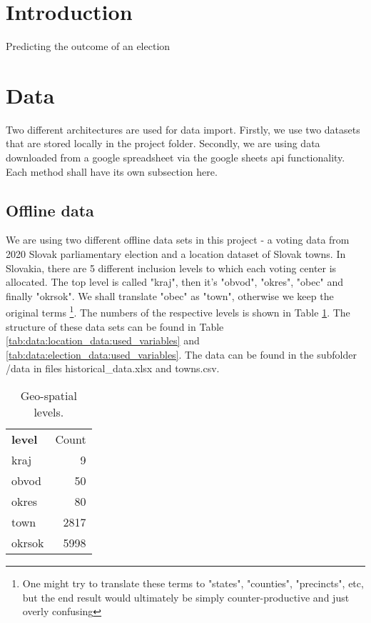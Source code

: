 \documentclass[12pt]{article}
\begin{document}
\section{Introduction}

Predicting the outcome of an election 

\section{Data}

Two different architectures are used for data import. Firstly, we use two datasets that are stored locally in the project folder. Secondly, we are using data downloaded from a google spreadsheet via the google sheets api functionality. Each method shall have its own subsection here.


\subsection{Offline data}

We are using two different offline data sets in this project - a voting data from 2020 Slovak parliamentary election and a location dataset of Slovak towns. In Slovakia, there are 5 different inclusion levels to which each voting center is allocated. The top level is called "kraj", then it's "obvod", "okres", "obec" and finally "okrsok". We shall translate "obec" as "town", otherwise we keep the original terms \footnote{One might try to translate these terms to "states", "counties", "precincts", etc, but the end result would ultimately be simply counter-productive and just overly confusing}. The numbers of the respective levels is shown in Table \ref{tab:data:Geo-spatial levels}. The structure of these data sets can be found in Table \ref{tab:data:location_data:used_variables} and \ref{tab:data:election_data:used_variables}. The data can be found in the subfolder /data in files historical\_data.xlsx and towns.csv.

\begin{table}[h]
	\centering
	\begin{tabularx}{.27\linewidth}{lr}
		\toprule
		\textbf{level} & Count \\
		kraj & 9 \\
		obvod & 50 \\
		okres & 80 \\
		town & 2817 \\
		okrsok & 5998 \\
		\bottomrule
	\end{tabularx}
	\caption{Geo-spatial levels.}
	\label{tab:data:Geo-spatial levels}
\end{table}
\end{document}
